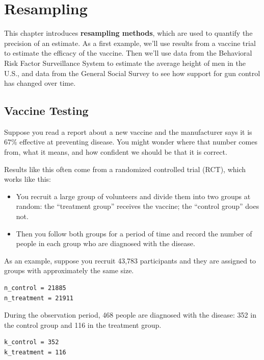 \hypertarget{resampling}{%
\chapter{Resampling}\label{resampling}}

This chapter introduces \textbf{resampling methods}, which are used to
quantify the precision of an estimate. As a first example, we'll use
results from a vaccine trial to estimate the efficacy of the vaccine.
Then we'll use data from the Behavioral Risk Factor Surveillance System
to estimate the average height of men in the U.S., and data from the
General Social Survey to see how support for gun control has changed
over time.

\hypertarget{vaccine-testing}{%
\section{Vaccine Testing}\label{vaccine-testing}}

Suppose you read a report about a new vaccine and the manufacturer says
it is 67\% effective at preventing disease. You might wonder where that
number comes from, what it means, and how confident we should be that it
is correct.

Results like this often come from a randomized controlled trial (RCT),
which works like this:

\begin{itemize}
\item
  You recruit a large group of volunteers and divide them into two
  groups at random: the ``treatment group'' receives the vaccine; the
  ``control group'' does not.
\item
  Then you follow both groups for a period of time and record the number
  of people in each group who are diagnosed with the disease.
\end{itemize}

As an example, suppose you recruit 43,783 participants and they are
assigned to groups with approximately the same size.

\begin{lstlisting}[]
n_control = 21885
n_treatment = 21911
\end{lstlisting}

During the observation period, 468 people are diagnosed with the
disease: 352 in the control group and 116 in the treatment group.

\begin{lstlisting}[]
k_control = 352
k_treatment = 116
\end{lstlisting}

